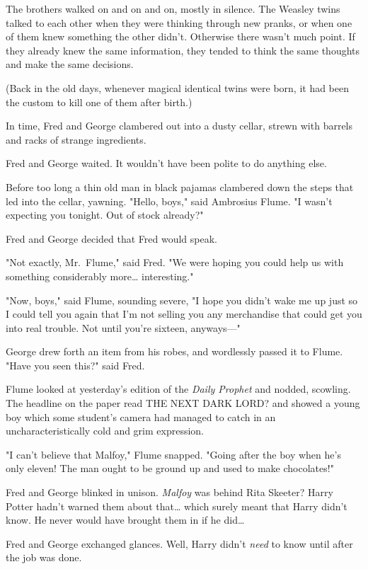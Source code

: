 The brothers walked on and on and on, mostly in silence. The Weasley twins 
talked to each other when they were thinking through new pranks, or when one of 
them knew something the other didn't. Otherwise there wasn't much point. If 
they already knew the same information, they tended to think the same thoughts 
and make the same decisions.

(Back in the old days, whenever magical identical twins were born, it had been 
the custom to kill one of them after birth.)

In time, Fred and George clambered out into a dusty cellar, strewn with barrels 
and racks of strange ingredients.

Fred and George waited. It wouldn't have been polite to do anything else.

Before too long a thin old man in black pajamas clambered down the steps that 
led into the cellar, yawning. "Hello, boys," said Ambrosius Flume. "I wasn't 
expecting you tonight. Out of stock already?"

Fred and George decided that Fred would speak.

"Not exactly, Mr.~Flume," said Fred. "We were hoping you could help us with 
something considerably more{\ldots} interesting."

"Now, boys," said Flume, sounding severe, "I hope you didn't wake me up just so 
I could tell you again that I'm not selling you any merchandise that could get 
you into real trouble. Not until you're sixteen, anyways---"

George drew forth an item from his robes, and wordlessly passed it to Flume. 
"Have you seen this?" said Fred.

Flume looked at yesterday's edition of the \emph{Daily Prophet} and nodded, 
scowling. The headline on the paper read THE NEXT DARK LORD? and showed a young 
boy which some student's camera had managed to catch in an uncharacteristically 
cold and grim expression.

"I can't believe that Malfoy," Flume snapped. "Going after the boy when he's 
only eleven! The man ought to be ground up and used to make chocolates!"

Fred and George blinked in unison. \emph{Malfoy} was behind Rita Skeeter? Harry 
Potter hadn't warned them about that{\ldots} which surely meant that Harry 
didn't know. He never would have brought them in if he did{\ldots}

Fred and George exchanged glances. Well, Harry didn't \emph{need} to know until 
after the job was done.

